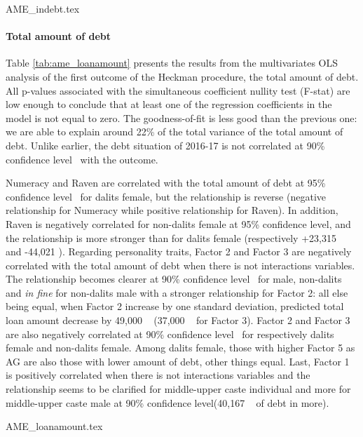 \documentclass[a4paper, 11pt, onecolumn]{article}
\newcommand{\sd}{standard deviation}
\newcommand{\aebe}{all else being equal}
\newcommand{\ote}{other things equal}
\newcommand{\cl}{confidence level}
\newcommand{\PTCS}{PT\&CS}
\begin{document}
{AME_indebt.tex}


\paragraph{Total amount of debt}
Table \ref{tab:ame_loanamount} presents the results from the multivariates OLS analysis of the first outcome of the Heckman procedure, the total amount of debt.
All p-values associated with the simultaneous coefficient nullity test (F-stat) are low enough to conclude that at least one of the regression coefficients in the model is not equal to zero.
The goodness-of-fit is less good than the previous one: we are able to explain around 22\% of the total variance of the total amount of debt.
Unlike earlier, the debt situation of 2016-17 is not correlated at 90\% \cl~ with the outcome.


Numeracy and Raven are correlated with the total amount of debt at 95\% \cl~ for dalits female, but the relationship is reverse (negative relationship for Numeracy while positive relationship for Raven).
In addition, Raven is negatively correlated for non-dalits female at 95\% \cl, and the relationship is more stronger than for dalits female (respectively +23,315 \rupee~ and -44,021 \rupee).
Regarding personality traits, Factor 2 and Factor 3 are negatively correlated with the total amount of debt when there is not interactions variables.
The relationship becomes clearer at 90\% \cl~ for male, non-dalits and \textit{in fine} for non-dalits male with a stronger relationship for Factor 2: \aebe, when Factor 2 increase by one \sd, predicted total loan amount decrease by 49,000 \rupee~ (37,000 \rupee~ for Factor 3).
Factor 2 and Factor 3 are also negatively correlated at 90\% \cl~ for respectively dalits female and non-dalits female.
Among dalits female, those with higher Factor 5 as AG are also those with lower amount of debt, \ote.
Last, Factor 1 is positively correlated when there is not interactions variables and the relationship seems to be clarified for middle-upper caste individual and more for middle-upper caste male at 90\% \cl (40,167 \rupee~ of debt in more).
 

{AME_loanamount.tex}
\end{document}
